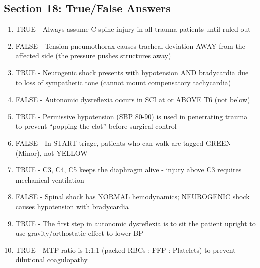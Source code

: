 \documentclass[11pt]{article}
\begin{document}
\subsection*{Section 18: True/False Answers}
\begin{enumerate}
    \item TRUE - Always assume C-spine injury in all trauma patients until ruled out
    \item FALSE - Tension pneumothorax causes tracheal deviation AWAY from the affected side (the pressure pushes structures away)
    \item TRUE - Neurogenic shock presents with hypotension AND bradycardia due to loss of sympathetic tone (cannot mount compensatory tachycardia)
    \item FALSE - Autonomic dysreflexia occurs in SCI at or ABOVE T6 (not below)
    \item TRUE - Permissive hypotension (SBP 80-90) is used in penetrating trauma to prevent ``popping the clot'' before surgical control
    \item FALSE - In START triage, patients who can walk are tagged GREEN (Minor), not YELLOW
    \item TRUE - C3, C4, C5 keeps the diaphragm alive - injury above C3 requires mechanical ventilation
    \item FALSE - Spinal shock has NORMAL hemodynamics; NEUROGENIC shock causes hypotension with bradycardia
    \item TRUE - The first step in autonomic dysreflexia is to sit the patient upright to use gravity/orthostatic effect to lower BP
    \item TRUE - MTP ratio is 1:1:1 (packed RBCs : FFP : Platelets) to prevent dilutional coagulopathy
\end{enumerate}
\end{document}
